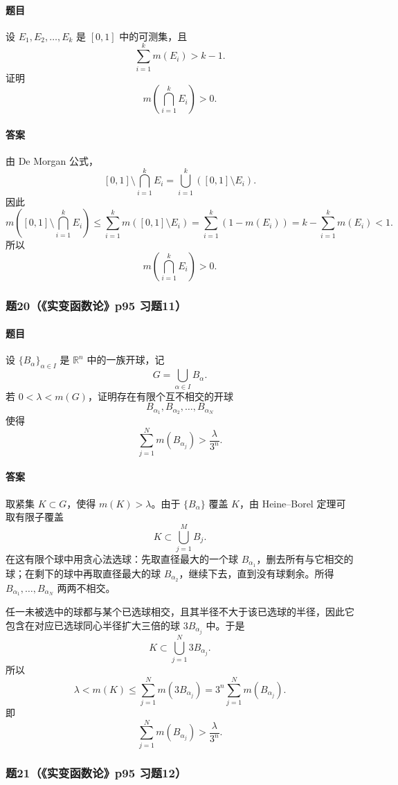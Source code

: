 \documentclass{article}
\newcommand{\R}{\mathbb{R}}
\newcommand{\meas}{m}
\begin{document}
\paragraph{题目}设 $E_1,E_2,\ldots,E_k$ 是 $[0,1]$ 中的可测集，且
\[
\sum_{i=1}^{k}\meas(E_i)>k-1.
\]
证明
\[
\meas\left(\bigcap_{i=1}^{k}E_i\right)>0.
\]

\paragraph{答案}由 De Morgan 公式，
\[
[0,1]\setminus\bigcap_{i=1}^{k}E_i
=\bigcup_{i=1}^{k}([0,1]\setminus E_i).
\]
因此
\[
\meas\left([0,1]\setminus\bigcap_{i=1}^{k}E_i\right)
\le \sum_{i=1}^{k}\meas([0,1]\setminus E_i)
=\sum_{i=1}^{k}(1-\meas(E_i))
=k-\sum_{i=1}^{k}\meas(E_i)<1.
\]
所以
\[
\meas\left(\bigcap_{i=1}^{k}E_i\right)>0.
\]

\subsubsection*{题20（《实变函数论》p95 习题11）}
\paragraph{题目}设 $\{B_\alpha\}_{\alpha\in I}$ 是 $\R^n$ 中的一族开球，记
\[
G=\bigcup_{\alpha\in I}B_\alpha.
\]
若 $0<\lambda<\meas(G)$，证明存在有限个互不相交的开球
\[
B_{\alpha_1},B_{\alpha_2},\ldots,B_{\alpha_N}
\]
使得
\[
\sum_{j=1}^{N}\meas(B_{\alpha_j})>\frac{\lambda}{3^n}.
\]

\paragraph{答案}取紧集 $K\subset G$，使得 $\meas(K)>\lambda$。由于 $\{B_\alpha\}$ 覆盖 $K$，由 Heine--Borel 定理可取有限子覆盖
\[
K\subset\bigcup_{j=1}^{M}B_j.
\]
在这有限个球中用贪心法选球：先取直径最大的一个球 $B_{\alpha_1}$，删去所有与它相交的球；在剩下的球中再取直径最大的球 $B_{\alpha_2}$，继续下去，直到没有球剩余。所得 $B_{\alpha_1},\ldots,B_{\alpha_N}$ 两两不相交。

任一未被选中的球都与某个已选球相交，且其半径不大于该已选球的半径，因此它包含在对应已选球同心半径扩大三倍的球 $3B_{\alpha_j}$ 中。于是
\[
K\subset\bigcup_{j=1}^{N}3B_{\alpha_j}.
\]
所以
\[
\lambda<\meas(K)
\le \sum_{j=1}^{N}\meas(3B_{\alpha_j})
=3^n\sum_{j=1}^{N}\meas(B_{\alpha_j}).
\]
即
\[
\sum_{j=1}^{N}\meas(B_{\alpha_j})>\frac{\lambda}{3^n}.
\]

\subsubsection*{题21（《实变函数论》p95 习题12）}
\end{document}
